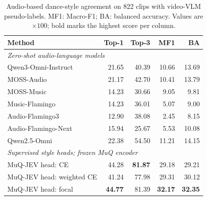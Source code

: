 \begin{table}[t]
\centering
\caption{Audio-based dance-style agreement on 822 clips with video-VLM pseudo-labels. MF1: Macro-F1; BA: balanced accuracy. Values are $\times100$; bold marks the highest score per column.}
\label{tab:style-prior-822}
\begingroup\small
\setlength{\tabcolsep}{5pt}
\renewcommand{\arraystretch}{1.08}
\begin{tabular*}{0.90\textwidth}{@{\extracolsep{\fill}}lrrrr@{}}
\toprule
Method & Top-1 & Top-3 & MF1 & BA \\
\midrule
\multicolumn{5}{l}{\emph{Zero-shot audio-language models}} \\
Qwen3-Omni-Instruct & 21.65 & 40.39 & 10.66 & 13.69 \\
MOSS-Audio & 21.17 & 42.70 & 10.41 & 13.79 \\
MOSS-Music & 14.23 & 30.66 & 9.05 & 9.81 \\
Music-Flamingo & 14.23 & 36.01 & 5.07 & 9.00 \\
Audio-Flamingo3 & 12.90 & 38.08 & 2.45 & 8.15 \\
Audio-Flamingo-Next & 15.94 & 25.67 & 5.53 & 10.08 \\
Qwen2.5-Omni & 22.38 & 54.50 & 11.21 & 14.15 \\
\midrule
\multicolumn{5}{l}{\emph{Supervised style heads; frozen MuQ encoder}} \\
MuQ-JEV head: CE & 44.28 & \textbf{81.87} & 29.18 & 29.21 \\
MuQ-JEV head: weighted CE & 41.24 & 77.98 & 29.31 & 30.12 \\
MuQ-JEV head: focal & \textbf{44.77} & 81.39 & \textbf{32.17} & \textbf{32.35} \\
\bottomrule
\end{tabular*}
\endgroup
\end{table}

